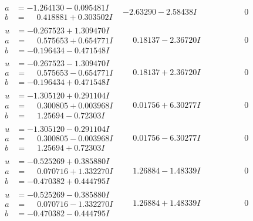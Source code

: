 \documentclass[1p]{elsarticle_modified}
\theoremstyle{definition}
\begin{document}
$$\begin{array}{c|c|c}
\begin{aligned}
a &= -1.264130 - 0.095481 I \\
b &= \phantom{-}0.418881 + 0.303502 I\end{aligned}
 & -2.63290 - 2.58438 I & \phantom{-0.000000 } 0 \\ \hline\begin{aligned}
u &= -0.267523 + 1.309470 I \\
a &= \phantom{-}0.575653 + 0.654771 I \\
b &= -0.196434 - 0.471548 I\end{aligned}
 & \phantom{-}0.18137 - 2.36720 I & \phantom{-0.000000 } 0 \\ \hline\begin{aligned}
u &= -0.267523 - 1.309470 I \\
a &= \phantom{-}0.575653 - 0.654771 I \\
b &= -0.196434 + 0.471548 I\end{aligned}
 & \phantom{-}0.18137 + 2.36720 I & \phantom{-0.000000 } 0 \\ \hline\begin{aligned}
u &= -1.305120 + 0.291104 I \\
a &= \phantom{-}0.300805 + 0.003968 I \\
b &= \phantom{-}1.25694 - 0.72303 I\end{aligned}
 & \phantom{-}0.01756 + 6.30277 I & \phantom{-0.000000 } 0 \\ \hline\begin{aligned}
u &= -1.305120 - 0.291104 I \\
a &= \phantom{-}0.300805 - 0.003968 I \\
b &= \phantom{-}1.25694 + 0.72303 I\end{aligned}
 & \phantom{-}0.01756 - 6.30277 I & \phantom{-0.000000 } 0 \\ \hline\begin{aligned}
u &= -0.525269 + 0.385880 I \\
a &= \phantom{-}0.070716 + 1.332270 I \\
b &= -0.470382 + 0.444795 I\end{aligned}
 & \phantom{-}1.26884 - 1.48339 I & \phantom{-0.000000 } 0 \\ \hline\begin{aligned}
u &= -0.525269 - 0.385880 I \\
a &= \phantom{-}0.070716 - 1.332270 I \\
b &= -0.470382 - 0.444795 I\end{aligned}
 & \phantom{-}1.26884 + 1.48339 I & \phantom{-0.000000 } 0 \\ \hline\begin{aligned}

\end{aligned}
\end{array}$$
\end{document}
